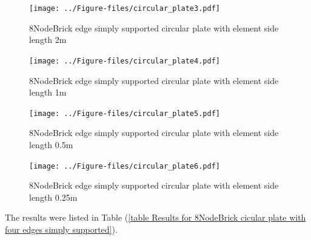 \documentclass[fleqn,11pt]{article}
\begin{document}
\begin{figure}[H]
  \centering
  \texttt{[image: ../Figure-files/circular\_plate3.pdf]}
  \caption{8NodeBrick edge simply supported circular plate with element side length 2m }
  \label{fig 8NodeBrick edges simply supported circular plate with element side length 2m }
\end{figure}

\newpage

\begin{figure}[H]
  \centering
  \texttt{[image: ../Figure-files/circular\_plate4.pdf]}
  \caption{8NodeBrick edge simply supported circular plate with element side length 1m }
  \label{fig 8NodeBrick edges simply supported circular plate with element side length 1m }
\end{figure}


\begin{figure}[H]
  \centering
  \texttt{[image: ../Figure-files/circular\_plate5.pdf]}
  \caption{8NodeBrick edge simply supported circular plate with element side length 0.5m }
  \label{fig 8NodeBrick edges simply supported circular plate with element side length 0.5m }
\end{figure}

\newpage

\begin{figure}[H]
  \centering
  \texttt{[image: ../Figure-files/circular\_plate6.pdf]}
  \caption{8NodeBrick edge simply supported circular plate with element side length 0.25m }
  \label{fig 8NodeBrick edges simply supported circular plate with element side length 0.25m }
\end{figure}





The results were listed in Table (\ref{table Results for 8NodeBrick cicular plate with four edges simply supported}).
\end{document}

